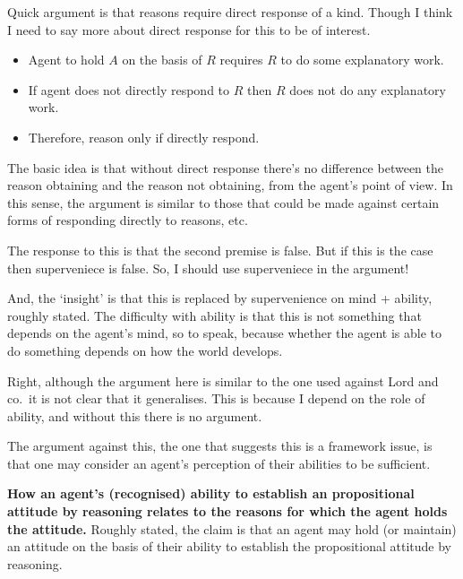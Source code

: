 \documentclass[10pt]{article}
\begin{document}
\begin{note}
  Quick argument is that reasons require direct response of a kind.
  Though I think I need to say more about direct response for this to be of interest.
  \begin{itemize}
  \item Agent to hold \(A\) on the basis of \(R\) requires \(R\) to do some explanatory work.
  \item If agent does not directly respond to \(R\) then \(R\) does not do any explanatory work.
  \item Therefore, reason only if directly respond.
  \end{itemize}
  The basic idea is that without direct response there's no difference between the reason obtaining and the reason not obtaining, from the agent's point of view.
  In this sense, the argument is similar to those that could be made against certain forms of responding directly to reasons, etc.

  The response to this is that the second premise is false.
  But if this is the case then superveniece is false.
  So, I should use superveniece in the argument!

  And, the `insight' is that this is replaced by supervenience on mind + ability, roughly stated.
  The difficulty with ability is that this is not something that depends on the agent's mind, so to speak, because whether the agent is able to do something depends on how the world develops.

  Right, although the argument here is similar to the one used against Lord and co.\ it is not clear that it generalises.
  This is because I depend on the role of ability, and without this there is no argument.

  The argument against this, the one that suggests this is a framework issue, is that one may consider an agent's perception of their abilities to be sufficient.
\end{note}

\newpage

\maketitle

\textbf{How an agent's (recognised) ability to establish an propositional attitude by reasoning relates to the reasons for which the agent holds the attitude.}
Roughly stated, the claim is that an agent may hold (or maintain) an attitude on the basis of their ability to establish the propositional attitude by reasoning.
\end{document}
